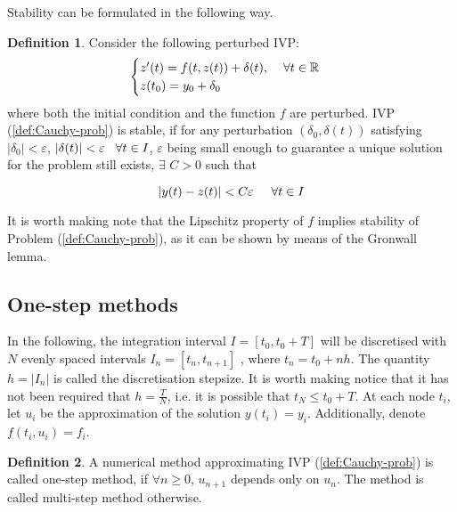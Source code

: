 \documentclass[11pt]{article}
\theoremstyle{theorem}
\theoremstyle{definition}
\newtheorem{definition}{Definition}
\begin{document}
Stability can be formulated in the following way.

\begin{definition}
	\label{def:stability}
	Consider the following perturbed IVP:
	\begin{align}
	\label{eqn:pert-prob}
	\begin{cases}
	z'(t)=f(t,z(t))+\delta(t),\hspace{4mm}\forall t\in\mathbb{R}\\
	z(t_0)=y_0+\delta_0
	\end{cases}
	\end{align}
	where both the initial condition and the function $f$ are perturbed. IVP (\ref{def:Cauchy-prob}) is stable, if for any perturbation $(\delta_0, \delta(t))$ satisfying $|\delta_0|<\varepsilon$, $|\delta(t)|<\varepsilon\hspace{3mm}\forall t\in I$, $\varepsilon$ being small enough to guarantee a unique solution for the problem still exists, $\exists$ $C>0$ such that 
	
	$$|y(t)-z(t)|<C\varepsilon\hspace{5mm}\forall t\in I$$ 
\end{definition}

It is worth making note that the Lipschitz property of $f$ implies stability of Problem (\ref{def:Cauchy-prob}), as it can be shown by means of the Gronwall lemma.\\

\subsection{One-step methods}
In the following, the integration interval $I=[t_0, t_0+T]$ will be discretised with $N$ evenly spaced intervals $I_n=[t_n, t_{n+1}]$ , where $t_n=t_0+nh$. The quantity $h=|I_n|$ is called the discretisation stepsize. It is worth making notice that it has not been required that $h=\frac{T}{N}$, i.e. it is possible that $t_N\le t_0 + T$.
At each node $t_i$, let $u_i$ be the approximation of the solution $y(t_i)=y_i$. Additionally, denote $f(t_i,u_i)=f_i$.\\

\begin{definition}
	\label{def:One-step-method}
	A numerical method approximating IVP (\ref{def:Cauchy-prob}) is called one-step method, if $\forall n\ge 0$, $u_{n+1}$ depends only on $u_n$. The method is called multi-step method otherwise.
\end{definition}
\end{document}

